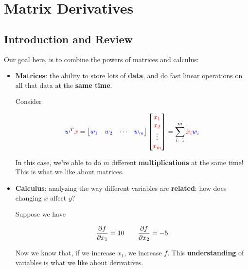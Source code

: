 

\chapter{Matrix Derivatives}

\section{Introduction and Review}

    
        
    Our goal here, is to combine the powers of matrices and calculus:
    
    \begin{itemize}
        \item \textbf{Matrices}: the ability to store lots of \textbf{data}, and do fast linear operations on all that data at the \textbf{same time}.
        
        \miniex Consider
        
        \begin{equation}
            \textcolor{blue}{w}^T\textcolor{red}{x} =
            \begin{bmatrix}
                \textcolor{blue}{w_1} & \textcolor{blue}{w_2} & \cdots & \textcolor{blue}{w_m}
            \end{bmatrix}
            \begin{bmatrix}
                \textcolor{red}{x_1} \\ \textcolor{red}{x_2} \\ \vdots \\ \textcolor{red}{x_m}
            \end{bmatrix}
            =
            \sum_{i=1}^m \textcolor{red}{x_i}\textcolor{blue}{w_i}
        \end{equation}
        
        In this case, we're able to do $m$ different \textbf{multiplications} at the same time! This is what we like about matrices.
        
        \item \textbf{Calculus}: analyzing the way different variables are \textbf{related}: how does changing $x$ affect $y$?
        
        \miniex Suppose we have 
        
        \begin{equation}
            \frac{\partial f}{\partial x_1}=10 \qquad 
            \frac{\partial f}{\partial x_2}=-5
        \end{equation}
        
        Now we know that, if we increase $x_1$, we increase $f$. This \textbf{understanding} of variables is what we like about derivatives.\\
    \end{itemize}
    
